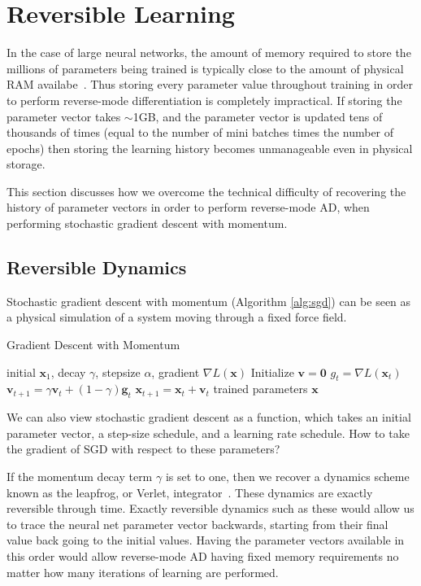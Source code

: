 \documentclass{article}
\newcommand{\vx}{\mathbf{x}}
\newcommand{\vv}{\mathbf{v}}
\newcommand{\vg}{\mathbf{g}}
\newcommand{\vzero}{\mathbf{0}}
\newcommand{\decay}{\gamma}
\newcommand{\stepsize}{\alpha}
\begin{document}
\section{Reversible Learning}

In the case of large neural networks, the amount of memory required to store the millions of parameters being trained is typically close to the amount of physical RAM availabe~\cite{sequence2014}.
Thus storing every parameter value throughout training in order to perform reverse-mode differentiation is completely impractical.
If storing the parameter vector takes $\sim$1GB, and the parameter vector is updated tens of thousands of times (equal to the number of mini batches times the number of epochs) then storing the learning history becomes unmanageable even in physical storage.

This section discusses how we overcome the technical difficulty of recovering the history of parameter vectors in order to perform reverse-mode AD, when performing stochastic gradient descent with momentum.

\subsection{Reversible Dynamics}

Stochastic gradient descent with momentum (Algorithm \ref{alg:sgd}) can be seen as a physical simulation of a system moving through a fixed force field.
%
\begin{algorithm}
   \caption{Gradient Descent with Momentum}
   \label{alg:sgd}
\begin{algorithmic}
    initial $\vx_1$, decay $\decay$, stepsize $\stepsize$, gradient $\nabla L(\vx)$
   \STATE Initialize $\vv = \vzero$
   \STATE $g_t = \nabla L(\vx_t)$
   \STATE $\vv_{t+1} = \decay \vv_t + (1 - \decay) \vg_t$ 
   \STATE $\vx_{t+1} = \vx_t + \vv_t$ 
   \ENDFOR
   \RETURN trained parameters $\vx$   
\end{algorithmic}
\end{algorithm}
%
We can also view stochastic gradient descent as a function, which takes an initial parameter vector, a step-size schedule, and a learning rate schedule.
How to take the gradient of SGD with respect to these parameters?

If the momentum decay term $\gamma$ is set to one, then we recover a dynamics scheme known as the leapfrog, or Verlet, integrator~\citep{leapfrog1995}.
These dynamics are exactly reversible through time.
Exactly reversible dynamics such as these would allow us to trace the neural net parameter vector backwards, starting from their final value back going to the initial values.
Having the parameter vectors available in this order would allow reverse-mode AD having fixed memory requirements no matter how many iterations of learning are performed.
\end{document}

